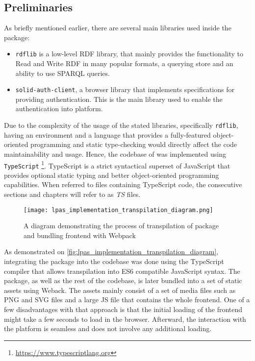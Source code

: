 \subsection{Preliminaries}

As briefly mentioned earlier, there are several main libraries used inside the \lpas{} package:

\begin{itemize}
    \item \texttt{rdflib} is a low-level RDF library, that mainly provides the functionality to Read and Write RDF in many popular formats, a querying store and an ability to use SPARQL queries.
    \item \texttt{solid-auth-client}, a browser library that implements \solid{} specifications for providing authentication. This is the main library used to enable the authentication into \lpa{} platform.
\end{itemize}

Due to the complexity of the usage of the stated libraries, specifically \texttt{rdflib}, having an environment and a language that provides a fully-featured object-oriented programming and static type-checking would directly affect the code maintainability and usage. Hence, the codebase of \lpas{} was implemented using \texttt{TypeScript} \footnote{\url{https://www.typescriptlang.org}}. TypeScript is a strict syntactical superset of JavaScript that provides optional static typing and better object-oriented programming capabilities. When referred to files containing TypeScript code, the consecutive sections and chapters will refer to as \textit{TS} files.

\begin{figure}[h]
\centering
\texttt{[image: lpas\_implementation\_transpilation\_diagram.png]}
\caption{A diagram demonstrating the process of transpilation of \lpas{} package and bundling \lpa{} frontend with Webpack}
\label{fig:lpas_implementation_transpilation_diagram}
\end{figure}

As demonstrated on \autoref{fig:lpas_implementation_transpilation_diagram}, integrating the package into the \lpa{} codebase was done using the TypeScript compiler that allows transpilation into ES6 compatible JavaScript syntax. The package, as well as the rest of the \lpa{} codebase,  is later bundled into a set of static assets using Weback. The assets mainly consist of a set of media files such as PNG and SVG files and a large JS file that contains the whole \lpa{} frontend. One of a few disadvantages with that approach is that the initial loading of the frontend might take a few seconds to load in the browser. Afterward, the interaction with the platform is seamless and does not involve any additional loading.

